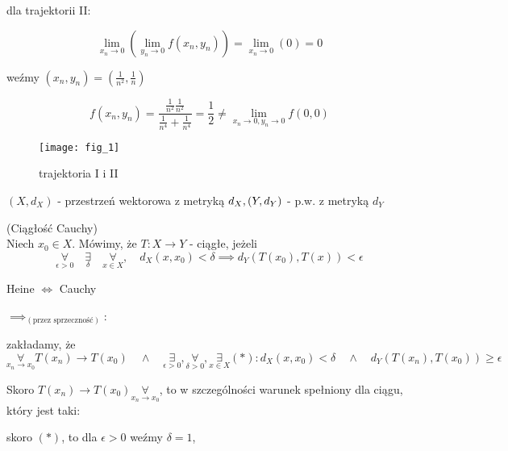 \documentclass[../main.tex]{subfiles}
\begin{document}
dla trajektorii II:

$$\lim\limits_{x_{n}\to 0}(\lim\limits_{y_{n}\rightarrow 0} f(x_{n},y_{n})) = \lim\limits_{x_{n}\rightarrow 0}(0) = 0$$

weźmy $(x_{n},y_{n}) = (\frac{1}{n^{2}},\frac{1}{n})$

$$f(x_{n},y_{n}) = \frac{\frac{1}{n^{2}} \frac{1}{n^{2}}}{\frac{1}{n^{4}}+\frac{1}{n^{4}}} = \frac{1}{2} \neq \lim\limits_{x_{n}\to 0, y_{n}\to 0} f(0,0)$$

\begin{figure}
    \centering
    \begin{center}
        \texttt{[image: fig\_1]}
    \end{center}
    \caption{trajektoria I i II}
\end{figure}

$(X,d_{X})$ - przestrzeń wektorowa z metryką $d_{X},\\ (Y,d_{Y})$ - p.w. z metryką $d_{Y}$

\begin{definicja}
    (Ciągłość Cauchy)\\
Niech $x_{0}\in X$. Mówimy, że $T: X\to Y$ - ciągłe, jeżeli
$$\underset{\epsilon > 0}{\forall} \quad\underset{\delta}{\exists} \quad\underset{x\in X}{\forall}, \quad d_{X} (x,x_{0}) < \delta \implies d_{Y} (T(x_{0}), T(x)) < \epsilon$$
\end{definicja}

\begin{dowod}
    Heine $\iff$ Cauchy
\end{dowod}

\begin{large}
    $\implies_{(\text{przez sprzeczność})}$:
\end{large}
\vspace{0.5cm}

zakładamy, że $$\underset{x_n \to x_0}{\forall} T(x_{n}) \to T(x_{0}) \quad\land\quad \underset{\epsilon > 0}{\exists}, \underset{\delta > 0}{\forall}, \underset{x\in X}{\exists} (*): d_{X} (x,x_{0}) < \delta \quad\land\quad d_{Y} (T(x_{n}),T(x_{0})) \geq \epsilon$$

Skoro $T(x_{n})\to T(x_{0}) \underset{x_n \to x_0}{\forall}$, to w szczególności warunek spełniony dla ciągu, który jest taki:

\vspace{0.3cm}
skoro $(*)$, to dla $\epsilon>0$ weźmy $\delta = 1$,
\end{document}
